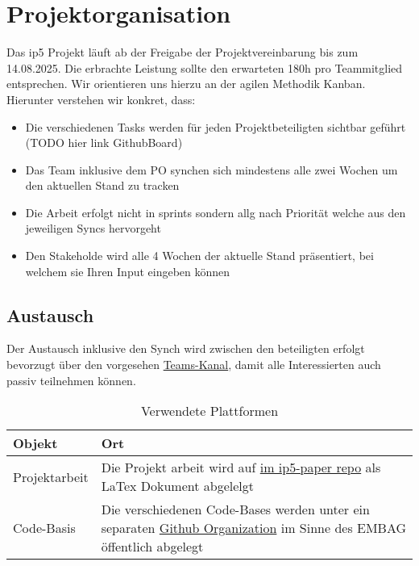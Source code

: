 \section{Projektorganisation}

Das ip5 Projekt läuft ab der Freigabe der Projektvereinbarung bis zum 14.08.2025. Die erbrachte Leistung sollte den erwarteten 180h pro Teammitglied entsprechen.
Wir orientieren uns hierzu an der agilen Methodik Kanban. Hierunter verstehen wir konkret, dass:
\begin{itemize}
    \item Die verschiedenen Tasks werden für jeden Projektbeteiligten sichtbar geführt (TODO hier link GithubBoard)
    \item Das Team inklusive dem PO synchen sich mindestens alle zwei Wochen um den aktuellen Stand zu tracken
    \item Die Arbeit erfolgt nicht in sprints sondern allg nach Priorität welche aus den jeweiligen Syncs hervorgeht
    \item Den Stakeholde wird alle 4 Wochen der aktuelle Stand präsentiert, bei welchem sie Ihren Input eingeben können
\end{itemize}

\subsection{Austausch}
Der Austausch inklusive den Synch wird zwischen den beteiligten erfolgt bevorzugt über den vorgesehen \href{https://teams.microsoft.com/l/channel/19%3A3bd20805200e482b809e5bf7b9294922%40thread.tacv2/25FS%20SGCWorkloadClassification?groupId=5c45c1ea-5d01-4a7b-8989-82ab37a27223&tenantId=9d1a5fc8-321e-4101-ae63-530730711ac2&ngc=true}{Teams-Kanal}, damit alle Interessierten auch passiv teilnehmen können.

\begin{table}[H]
    \centering
    \begin{tabularx}{\textwidth}{|l|X|}
        \hline
        \textbf{Objekt} & \textbf{Ort} \\
        \hline
        Projektarbeit & Die Projekt arbeit wird auf \href{https://gitlab.fhnw.ch/cloudgovernance/ip5-paper}{im ip5-paper repo} als LaTex Dokument abgelelgt \\
        \hline
        Code-Basis & Die verschiedenen Code-Bases werden unter ein separaten \href{TODO-link}{Github Organization} im Sinne des EMBAG öffentlich abgelegt  \\
        \hline
    \end{tabularx}
    \caption{Verwendete Plattformen}
    \label{tab:used-plattforms}
\end{table}


